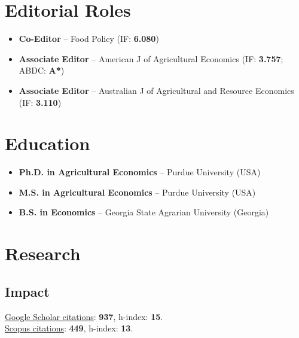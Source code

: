 \documentclass[10pt]{article}
\begin{document}
	\section*{Editorial Roles}
	\begin{itemize}
		\item {} \textbf{Co-Editor} -- Food Policy (IF: \textbf{6.080})
		\item {} \textbf{Associate Editor} -- American J of Agricultural Economics (IF: \textbf{3.757}; ABDC: \textbf{A*})
		\item {} \textbf{Associate Editor} -- Australian J of Agricultural and Resource Economics (IF: \textbf{3.110})
	\end{itemize}
	
	\section*{Education}
	\begin{itemize}
		\item {} \textbf{Ph.D. in Agricultural Economics} -- Purdue University (USA)
		\item {} \textbf{M.S. in Agricultural Economics} -- Purdue University (USA)
		\item {} \textbf{B.S. in Economics} -- Georgia State Agrarian University (Georgia)
	\end{itemize}
	
	\section*{Research}
	
	\subsection*{Impact}
	\href{https://scholar.google.com/citations?user=VbNOr6wAAAAJ&hl=en}{Google Scholar citations}: \textbf{937}, h-index: \textbf{15}.\\	
	\href{https://www.scopus.com/authid/detail.uri?authorId=26421832000}{Scopus citations}: \textbf{449}, h-index: \textbf{13}.	
	
	\begin{refsection}[papers]
		\nocite{ubilava2023ajae,ferguson2022,ubilava2022agec,hastings2022,angus2021,atalay2021,ubilava2019el,ubilava2019erl,ubilava2019md,ubilava2018ajae,smith2017gec,ubilava2017wd,tack2015agec,ubilava2014erae,tack2013cc,ubilava2013ems,ubilava2013ajare,ubilava2012agec,ubilava2012agri,ubilava2011jare,ubilava2011jcb,ubilava2010tfsc,ubilava2009fp}
		\printbibliography[heading={articles}]
	\end{refsection}
	\begin{refsection}[papers]
		\nocite{rice_enso,conflict_seasia}
		\printbibliography[heading={papers}]
	\end{refsection}
	
\end{document}
